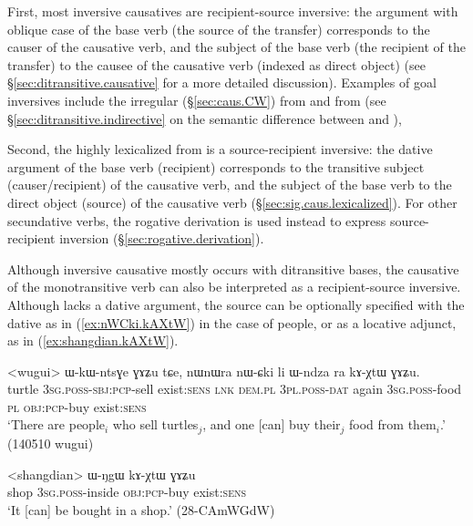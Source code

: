 First, most inversive causatives are recipient-source inversive: the argument with oblique case of the base verb (the source of the transfer) corresponds to the causer of the causative verb, and the subject of the base verb (the recipient of the transfer) to the causee of the causative verb  (indexed as direct object) (see §\ref{sec:ditransitive.causative} for a more detailed discussion). Examples of goal inversives include the irregular  (§\ref{sec:caus.CW}) from  and  from  (see §\ref{sec:ditransitive.indirective} on the semantic difference between  and ), 

Second, the highly lexicalized  from  is a source-recipient inversive: the dative argument of the base verb (recipient) corresponds to the transitive subject (causer/recipient) of the causative verb, and the subject of the base verb to the direct object (source) of the causative verb (§\ref{sec:sig.caus.lexicalized}). For other secundative verbs, the rogative  derivation is used instead to express source-recipient inversion (§\ref{sec:rogative.derivation}).

Although inversive causative mostly occurs with ditransitive bases, the causative of the monotransitive verb  can also be interpreted as a recipient-source inversive. Although  lacks a dative argument, the source can be optionally specified with the dative as in (\ref{ex:nWCki.kAXtW}) in the case of people, or as a locative adjunct, as in (\ref{ex:shangdian.kAXtW}).
 
 \begin{exe}
\ex \label{ex:nWCki.kAXtW}
\gll  <wugui> ɯ-kɯ-ntsɣe ɣɤʑu tɕe, nɯnɯra nɯ-ɕki li ɯ-ndza ra kɤ-χtɯ ɣɤʑu. \\
turtle \textsc{3sg}.\textsc{poss}-\textsc{sbj}:\textsc{pcp}-sell exist:\textsc{sens} \textsc{lnk} \textsc{dem}.\textsc{pl} \textsc{3pl}.\textsc{poss}-\textsc{dat} again \textsc{3sg}.\textsc{poss}-food \textsc{pl} \textsc{obj}:\textsc{pcp}-buy exist:\textsc{sens} \\
\glt `There are people$_i$ who sell turtles$_j$, and one [can] buy their$_j$ food from them$_i$.' (140510 wugui)
\end{exe}

\begin{exe}
\ex \label{ex:shangdian.kAXtW}
\gll <shangdian> ɯ-ŋgɯ kɤ-χtɯ ɣɤʑu \\
shop \textsc{3sg}.\textsc{poss}-inside \textsc{obj}:\textsc{pcp}-buy exist:\textsc{sens} \\
\glt `It [can] be bought in a shop.' (28-CAmWGdW)
\end{exe}


